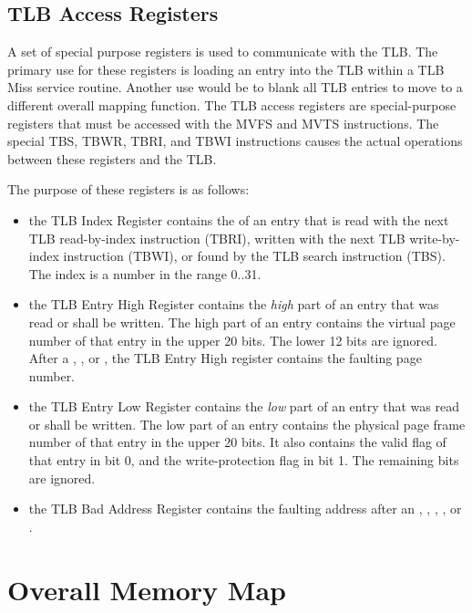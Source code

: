 \subsection{TLB Access Registers}

A set of special purpose registers is used to communicate with the TLB. The primary use for these registers is loading an entry into the TLB within a TLB Miss service routine. Another use would be to blank all TLB entries to move to a different overall mapping function. The TLB access registers are special-purpose registers that must be accessed with the MVFS and MVTS instructions. The special TBS, TBWR, TBRI, and TBWI instructions causes the actual operations between these registers and the TLB.

The purpose of these registers is as follows:
\begin{itemize}
\item the TLB Index Register contains the  of an entry that is read with the next TLB read-by-index instruction (TBRI), written with the next TLB write-by-index instruction (TBWI), or found by the TLB search instruction (TBS). The index is a number in the range 0..31.
\item the TLB Entry High Register contains the {\it high} part of an entry that was read or shall be written. The high part of an entry contains the virtual page number of that entry in the upper 20 bits. The lower 12 bits are ignored. After a , , or , the TLB Entry High register contains the faulting page number.
\item the TLB Entry Low Register contains the {\it low} part of an entry that was read or shall be written. The low part of an entry contains the physical page frame number of that entry in the upper 20 bits. It also contains the valid flag of that entry in bit 0, and the write-protection flag in bit 1. The remaining bits are ignored.
\item the TLB Bad Address Register contains the faulting address after an , , , , or .
\end{itemize}

\section{Overall Memory Map}

